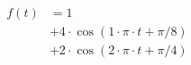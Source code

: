 \correct
\begin{center}
\begin{align*}
f(t) &= 1 \\
&+ 4 \cdot \cos( 1 \cdot \pi \cdot t + \pi/8 ) \\
&+ 2 \cdot \cos( 2 \cdot \pi \cdot t + \pi/4)
\end{align*}
\end{center}

